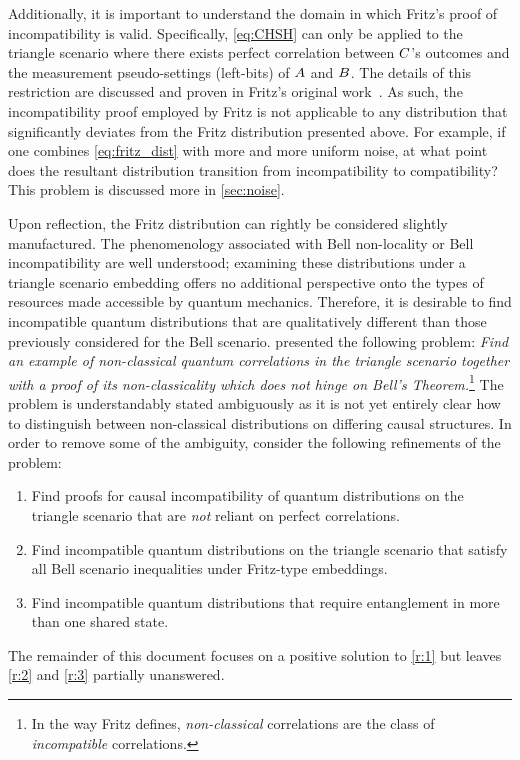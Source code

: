 \documentclass[aps, 10pt, english, twoside, pra, nofootinbib, tightenlines, longbibliography]{revtex4-1}
\begin{document}
    Additionally, it is important to understand the domain in which Fritz's proof of incompatibility is valid. Specifically, \cref{eq:CHSH} can only be applied to the triangle scenario where there exists perfect correlation between $C$'s outcomes and the measurement pseudo-settings (left-bits) of $A$ and $B$. The details of this restriction are discussed and proven in Fritz's original work~\cite{Fritz_2012}. As such, the incompatibility proof employed by Fritz is not applicable to any distribution that significantly deviates from the Fritz distribution presented above. For example, if one combines \cref{eq:fritz_dist} with more and more uniform noise, at what point does the resultant distribution transition from incompatibility to compatibility? This problem is discussed more in \cref{sec:noise}.

    Upon reflection, the Fritz distribution can rightly be considered slightly manufactured. The phenomenology associated with Bell non-locality or Bell incompatibility are well understood; examining these distributions under a triangle scenario embedding offers no additional perspective onto the types of resources made accessible by quantum mechanics. Therefore, it is desirable to find incompatible quantum distributions that are qualitatively different than those previously considered for the Bell scenario. \citet{Fritz_2012} presented the following problem: \textit{Find an example of non-classical quantum correlations in the triangle scenario together with a proof of its non-classicality which does not hinge on Bell’s Theorem.}\footnote{In the way Fritz defines, \textit{non-classical} correlations are the class of \textit{incompatible} correlations.} The problem is understandably stated ambiguously as it is not yet entirely clear how to distinguish between non-classical distributions on differing causal structures. In order to remove some of the ambiguity, consider the following refinements of the problem:
    \begin{enumerate}[label=\textbf{R.\arabic*}]
        \item \label{r:1} Find proofs for causal incompatibility of quantum distributions on the triangle scenario that are \textit{not} reliant on perfect correlations.
        \item \label{r:2} Find incompatible quantum distributions on the triangle scenario that satisfy all Bell scenario inequalities under Fritz-type embeddings.
        \item \label{r:3} Find incompatible quantum distributions that require entanglement in more than one shared state.
    \end{enumerate}
    The remainder of this document focuses on a positive solution to \ref{r:1} but leaves \ref{r:2} and \ref{r:3} partially unanswered.
\end{document}
